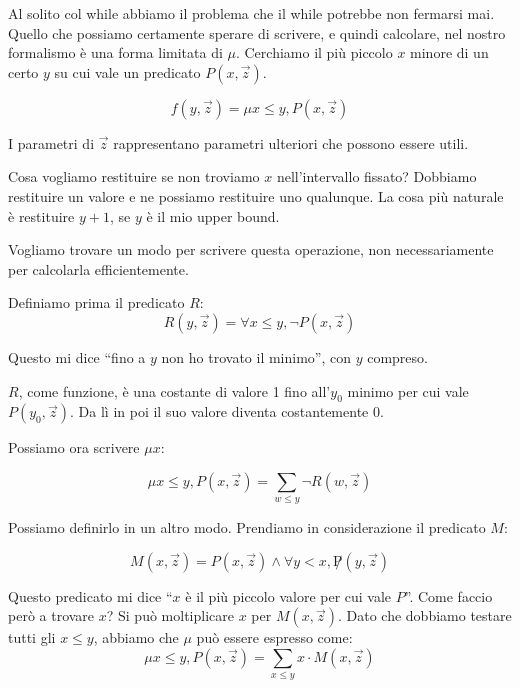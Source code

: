 Al solito col while abbiamo il problema che il while potrebbe non fermarsi mai. Quello che possiamo
certamente sperare di scrivere, e quindi calcolare, nel nostro formalismo è una forma limitata di
$\mu$. Cerchiamo il più piccolo $x$ minore di un certo $y$ su cui vale un predicato $P(x,\vec{z})$.

\begin{equation*}
    f(y,\vec{z}) = \mu x \leq y, P(x,\vec{z})
\end{equation*}

I parametri di $\vec{z}$ rappresentano parametri ulteriori che possono essere utili.

Cosa vogliamo restituire se non troviamo $x$ nell'intervallo fissato? Dobbiamo restituire un valore
e ne possiamo restituire uno qualunque. La cosa più naturale è restituire $y + 1$, se $y$ è il
mio upper bound.

Vogliamo trovare un modo per scrivere questa operazione, non necessariamente per calcolarla
efficientemente.

Definiamo prima il predicato $R$:
\begin{equation*}
    R(y,\vec{z}) = \forall x \leq y, \lnot P(x,\vec{z})
\end{equation*}

Questo mi dice ``fino a $y$ non ho trovato il minimo'', con $y$ compreso.

$R$, come funzione, è una costante di valore 1 fino all'$y_{0}$ minimo per cui vale
$P(y_{0},\vec{z})$. Da lì in poi il suo valore diventa costantemente 0.

Possiamo ora scrivere $\mu x$:

\begin{equation*}
    \mu x \leq y, P(x,\vec{z}) = \sum_{w \leq y}\lnot R(w,\vec{z})
\end{equation*}

Possiamo definirlo in un altro modo. Prendiamo in considerazione il predicato $M$:

\begin{equation*}
    M(x,\vec{z}) = P(x,\vec{z}) \land \forall y < x, \not P(y,\vec{z})
\end{equation*}

Questo predicato mi dice ``$x$ è il più piccolo valore per cui vale $P$''. Come faccio però a trovare
$x$? Si può moltiplicare $x$ per $M(x,\vec{z})$. Dato che dobbiamo testare tutti gli $x \leq y$, abbiamo
che $\mu$ può essere espresso come:
\begin{equation*}
    \mu x \leq y, P(x,\vec{z}) = \sum_{x \leq y} x \cdot M(x,\vec{z})
\end{equation*}

